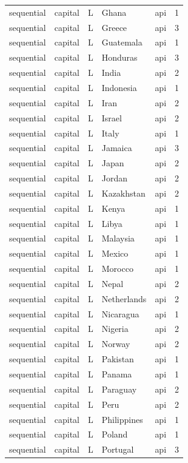 \begin{tabular}{lllllr}
sequential & capital & L & Ghana & api & 1 \\
sequential & capital & L & Greece & api & 3 \\
sequential & capital & L & Guatemala & api & 1 \\
sequential & capital & L & Honduras & api & 3 \\
sequential & capital & L & India & api & 2 \\
sequential & capital & L & Indonesia & api & 1 \\
sequential & capital & L & Iran & api & 2 \\
sequential & capital & L & Israel & api & 2 \\
sequential & capital & L & Italy & api & 1 \\
sequential & capital & L & Jamaica & api & 3 \\
sequential & capital & L & Japan & api & 2 \\
sequential & capital & L & Jordan & api & 2 \\
sequential & capital & L & Kazakhstan & api & 2 \\
sequential & capital & L & Kenya & api & 1 \\
sequential & capital & L & Libya & api & 1 \\
sequential & capital & L & Malaysia & api & 1 \\
sequential & capital & L & Mexico & api & 1 \\
sequential & capital & L & Morocco & api & 1 \\
sequential & capital & L & Nepal & api & 2 \\
sequential & capital & L & Netherlands & api & 2 \\
sequential & capital & L & Nicaragua & api & 1 \\
sequential & capital & L & Nigeria & api & 2 \\
sequential & capital & L & Norway & api & 2 \\
sequential & capital & L & Pakistan & api & 1 \\
sequential & capital & L & Panama & api & 1 \\
sequential & capital & L & Paraguay & api & 2 \\
sequential & capital & L & Peru & api & 2 \\
sequential & capital & L & Philippines & api & 1 \\
sequential & capital & L & Poland & api & 1 \\
sequential & capital & L & Portugal & api & 3 \\

\end{tabular}
